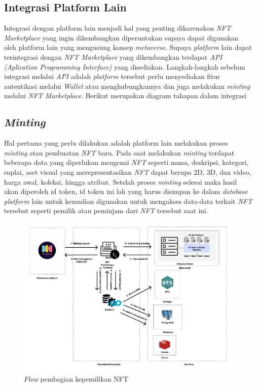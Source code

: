 \subsection{Integrasi Platform Lain}

Integrasi dengan platform lain menjadi hal yang penting dikarenakan \emph{NFT Marketplace} yang ingin dikembangkan diperuntukan supaya dapat digunakan oleh platform lain yang mengusung konsep \emph{metaverse}. Supaya \emph{platform} lain dapat terintegrasi dengan \emph{NFT Marketplace} yang dikembangkan terdapat \emph{API (Aplication Programming Interface)} yang disediakan. Langkah-langkah sebelum integrasi melalui \emph{API} adalah \emph{platform} tersebut perlu menyediakan fitur autentikasi melalui \emph{Wallet} atau menghubungkannya dan juga melakukan \emph{minting} melalui \emph{NFT Marketplace}. Berikut merupakan diagram tahapan dalam integrasi

\subsection{\emph{Minting}}

Hal pertama yang perlu dilakukan adalah platform lain melakukan proses \emph{minting} atau pembuatan \emph{NFT} baru. 
Pada saat melakukan \emph{minting} terdapat beberapa data yang diperlukan mengenai \emph{NFT} seperti nama, deskripsi, kategori, suplai, aset visual yang merepresentasikan \emph{NFT} dapat berupa 2D, 3D, dan video, harga awal, koleksi, hingga atribut. Setelah proses \emph{minting} selesai maka hasil akan diperoleh id token, id token ini lah yang harus disimpan ke dalam \emph{database} \emph{platform} lain untuk kemudian digunakan untuk mengakses data-data terkait \emph{NFT} tersebut seperti pemilik atau peminjam dari \emph{NFT} tersebut saat ini.

\begin{figure} [H]
  \includegraphics[width=\columnwidth,height=8cm]{gambar/img-integration-minting.png}
  \caption{\emph{Flow} pembagian kepemilikan NFT}
  \label{fig:Fractional}
\end{figure}

